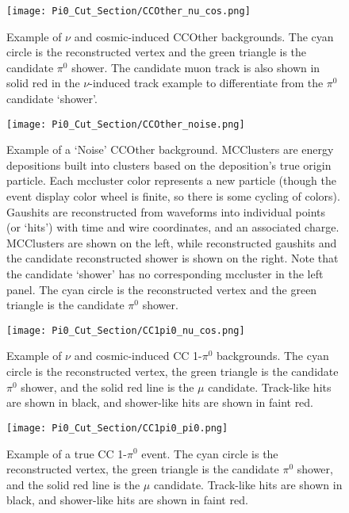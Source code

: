 \documentclass{article}
\begin{document}
\begin{figure}[h!]
\centering
\texttt{[image: Pi0\_Cut\_Section/CCOther\_nu\_cos.png]}
\hspace{1 mm}
\caption{ Example of $\nu$ and cosmic-induced CCOther backgrounds. The cyan circle is the reconstructed vertex and the green triangle is the candidate $\pi^0$ shower.  The candidate muon track is also shown in solid red in the $\nu$-induced track example to differentiate from the $\pi^0$ candidate `shower'.  }
\label{fig:ccoth_bkgd_nu_cos}
\end{figure}

\begin{figure}[h!]
\centering
\texttt{[image: Pi0\_Cut\_Section/CCOther\_noise.png]}
\caption{ Example of a `Noise' CCOther background. MCClusters are energy depositions built into clusters based on the deposition’s true origin particle. Each mccluster color represents a new particle (though the event display color wheel is finite, so there is some cycling of colors).  Gaushits are reconstructed from waveforms into individual points (or `hits') with time and wire coordinates, and an associated charge. MCClusters are shown on the left, while reconstructed gaushits and the candidate reconstructed shower is shown on the right.
 Note that the candidate `shower' has no corresponding mccluster in the left panel. The cyan circle is the reconstructed vertex and the green triangle is the candidate $\pi^0$ shower.  }
\label{fig:ccoth_bkgd_noise}
\end{figure}

\begin{figure}[h!]
\centering
\texttt{[image: Pi0\_Cut\_Section/CC1pi0\_nu\_cos.png]}
\caption{ Example of $\nu$ and cosmic-induced CC 1-$\pi^0$ backgrounds. The cyan circle is the reconstructed vertex, the green triangle is the candidate $\pi^0$ shower, and the solid red line is the $\mu$ candidate. Track-like hits are shown in black, and shower-like hits are shown in faint red. }
\label{fig:cc1pi0_nu_cos}
\end{figure}

\begin{figure}[h!]
\centering
\texttt{[image: Pi0\_Cut\_Section/CC1pi0\_pi0.png]}
\caption{ Example of a true CC 1-$\pi^0$ event. The cyan circle is the reconstructed vertex, the green triangle is the candidate $\pi^0$ shower, and the solid red line is the $\mu$ candidate. Track-like hits are shown in black, and shower-like hits are shown in faint red. }
\label{fig:cc1pi0_pi0}
\end{figure}
\end{document}

